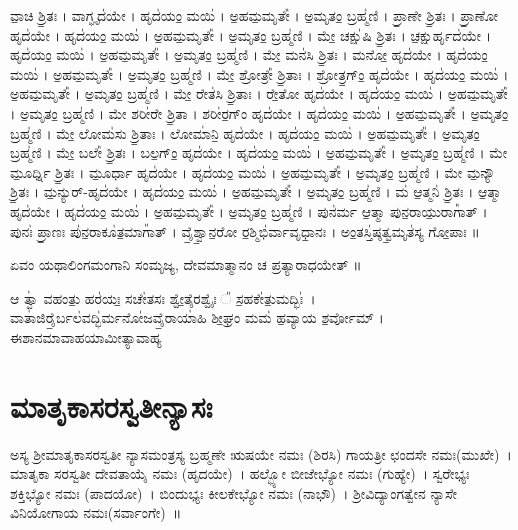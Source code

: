  ವಾ॒ಚಿ ಶ್ರಿ॒ತಃ । ವಾಗ್ಘೃದ॑ಯೇ । ಹೃದ॑ಯಂ॒ ಮಯಿ॑ । ಅ॒ಹಮ॒ಮೃತೇ᳚ । ಅ॒ಮೃತಂ॒ ಬ್ರಹ್ಮ॑ಣಿ ।  ಪ್ರಾ॒ಣೇ ಶ್ರಿ॒ತಃ । ಪ್ರಾ॒ಣೋ ಹೃದ॑ಯೇ । ಹೃದ॑ಯಂ॒ ಮಯಿ॑ । ಅ॒ಹಮ॒ಮೃತೇ᳚ । ಅ॒ಮೃತಂ॒ ಬ್ರಹ್ಮ॑ಣಿ ।  ಮೇ॒ ಚಕ್ಷು॑ಷಿ ಶ್ರಿ॒ತಃ । ಚ॒ಕ್ಷುರ್ಹೃದ॑ಯೇ । ಹೃದ॑ಯಂ॒ ಮಯಿ॑ । ಅ॒ಹಮ॒ಮೃತೇ᳚ । ಅ॒ಮೃತಂ॒ ಬ್ರಹ್ಮ॑ಣಿ ।  ಮೇ॒ ಮನ॑ಸಿ ಶ್ರಿ॒ತಃ । ಮನೋ॒ ಹೃದ॑ಯೇ । ಹೃದ॑ಯಂ॒ ಮಯಿ॑ । ಅ॒ಹಮ॒ಮೃತೇ᳚ । ಅ॒ಮೃತಂ॒ ಬ್ರಹ್ಮ॑ಣಿ ।  ಮೇ॒ ಶ್ರೋತ್ರೇ᳚ ಶ್ರಿ॒ತಾಃ । ಶ್ರೋತ್ರ॒ಗ್ಂ॒ ಹೃದ॑ಯೇ । ಹೃದ॑ಯಂ॒ ಮಯಿ॑ । ಅ॒ಹಮ॒ಮೃತೇ᳚ । ಅ॒ಮೃತಂ॒ ಬ್ರಹ್ಮ॑ಣಿ ।  ಮೇ॒ ರೇತ॑ಸಿ ಶ್ರಿ॒ತಾಃ । ರೇ॒ತೋ ಹೃದ॑ಯೇ । ಹೃದ॑ಯಂ॒ ಮಯಿ॑ । ಅ॒ಹಮ॒ಮೃತೇ᳚ । ಅ॒ಮೃತಂ॒ ಬ್ರಹ್ಮ॑ಣಿ ।  ಮೇ ಶರೀ॑ರೇ ಶ್ರಿ॒ತಾ । ಶರೀ॑ರ॒ಗ್ಂ ಹೃದ॑ಯೇ । ಹೃದ॑ಯಂ॒ ಮಯಿ॑ । ಅ॒ಹಮ॒ಮೃತೇ᳚ । ಅ॒ಮೃತಂ॒ ಬ್ರಹ್ಮ॑ಣಿ ।  ಮೇ॒ ಲೋಮ॑ಸು ಶ್ರಿ॒ತಾಃ । ಲೋಮಾ॑ನಿ॒ ಹೃದ॑ಯೇ । ಹೃದ॑ಯಂ॒ ಮಯಿ॑ । ಅ॒ಹಮ॒ಮೃತೇ᳚ । ಅ॒ಮೃತಂ॒ ಬ್ರಹ್ಮ॑ಣಿ ।  ಮೇ॒ ಬಲೇ᳚ ಶ್ರಿ॒ತಃ । ಬಲ॒ಗ್ಂ॒ ಹೃದ॑ಯೇ । ಹೃದ॑ಯಂ॒ ಮಯಿ॑ । ಅ॒ಹಮ॒ಮೃತೇ᳚ । ಅ॒ಮೃತಂ॒ ಬ್ರಹ್ಮ॑ಣಿ ।  ಮೇ ಮೂ॒ರ್ಧ್ನಿ ಶ್ರಿ॒ತಃ । ಮೂ॒ರ್ಧಾ ಹೃದ॑ಯೇ । ಹೃದ॑ಯಂ॒ ಮಯಿ॑ । ಅ॒ಹಮ॒ಮೃತೇ᳚ । ಅ॒ಮೃತಂ॒ ಬ್ರಹ್ಮ॑ಣಿ ।  ಮೇ ಮ॒ನ್ಯೌ ಶ್ರಿ॒ತಃ । ಮ॒ನ್ಯುರ್-ಹೃದ॑ಯೇ । ಹೃದ॑ಯಂ॒ ಮಯಿ॑ । ಅ॒ಹಮ॒ಮೃತೇ᳚ । ಅ॒ಮೃತಂ॒ ಬ್ರಹ್ಮ॑ಣಿ ।  ಮ॑ ಆ॒ತ್ಮನಿ॑ ಶ್ರಿ॒ತಃ । ಆ॒ತ್ಮಾ ಹೃದ॑ಯೇ । ಹೃದ॑ಯಂ॒ ಮಯಿ॑ । ಅ॒ಹಮ॒ಮೃತೇ᳚ । ಅ॒ಮೃತಂ॒ ಬ್ರಹ್ಮ॑ಣಿ । ಪುನ॑ರ್ಮ ಆ॒ತ್ಮಾ ಪುನ॒ರಾಯು॒ರಾಗಾ᳚ತ್ । ಪುನಃ॑ ಪ್ರಾ॒ಣಃ ಪು॑ನ॒ರಾಕೂ॑ತ॒ಮಾಗಾ᳚ತ್ । ವೈ॒ಶ್ವಾ॒ನ॒ರೋ ರ॒ಶ್ಮಿಭಿ॑ರ್ವಾವೃಧಾ॒ನಃ । ಅಂ॒ತಸ್ತಿ॑ಷ್ಠತ್ವ॒ಮೃತ॑ಸ್ಯ ಗೋ॒ಪಾಃ ॥

ಏವಂ ಯಥಾಲಿಂಗಮಂಗಾನಿ ಸಂಮೃಜ್ಯ, ದೇವಮಾತ್ಮಾನಂ ಚ ಪ್ರತ್ಯಾರಾಧಯೇತ್ ॥\\

ಆ ತ್ವಾ॑ ವಹಂತು॒ ಹರ॑ಯಃ॒ ಸಚೇ॑ತಸಃ ಶ್ವೇ॒ತೈರಶ್ವೈಃ ᳚  ಸ॒ಹಕೇ॑ತು॒ಮದ್ಭಿಃ॑~। ವಾತಾ॑ಜಿರೈ॒ರ್ಬಲ॑ವದ್ಭಿ॑ರ್ಮನೋ॑ಜವೈ॒ರಾಯಾ॑ಹಿ ಶೀ॒ಘ್ರಂ ಮಮ॑ ಹ॒ವ್ಯಾಯ ಶ॒ರ್ವೋಮ್ । ಈಶಾನಮಾವಾಹಯಾಮೀತ್ಯಾವಾಹ್ಯ\\
\section{ಮಾತೃಕಾಸರಸ್ವತೀನ್ಯಾಸಃ}
ಅಸ್ಯ ಶ್ರೀಮಾತೃಕಾಸರಸ್ವತೀ ನ್ಯಾಸಮಂತ್ರಸ್ಯ ಬ್ರಹ್ಮಣೇ ಋಷಯೇ ನಮಃ (ಶಿರಸಿ) ಗಾಯತ್ರೀ ಛಂದಸೇ ನಮಃ(ಮುಖೇ)~। ಮಾತೃಕಾ ಸರಸ್ವತೀ ದೇವತಾಯೈ ನಮಃ (ಹೃದಯೇ)~। ಹಲ್ಭ್ಯೋ ಬೀಜೇಭ್ಯೋ ನಮಃ (ಗುಹ್ಯೇ)~। ಸ್ವರೇಭ್ಯಃ ಶಕ್ತಿಭ್ಯೋ ನಮಃ (ಪಾದಯೋ)~। ಬಿಂದುಭ್ಯಃ ಕೀಲಕೇಭ್ಯೋ ನಮಃ (ನಾಭೌ)~। ಶ್ರೀವಿದ್ಯಾಂಗತ್ವೇನ ನ್ಯಾಸೇ ವಿನಿಯೋಗಾಯ ನಮಃ(ಸರ್ವಾಂಗೇ)~॥

